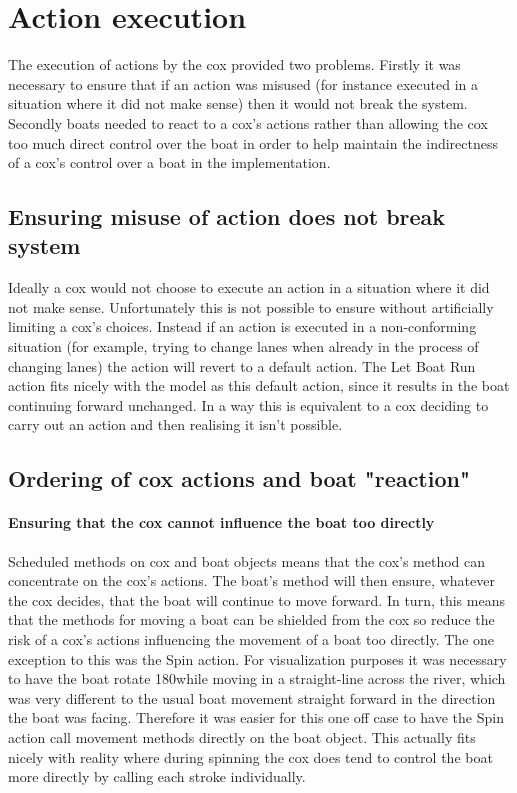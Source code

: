   \section{Action execution}
  The execution of actions by the cox provided two problems. Firstly it was necessary to ensure that if an action was misused (for instance executed in a situation where it did not make sense) then it would not break the system. Secondly boats needed to react to a cox's actions rather than allowing the cox too much direct control over the boat in order to help maintain the indirectness of a cox's control over a boat in the implementation.
  
    \subsection{Ensuring misuse of action does not break system}
    Ideally a cox would not choose to execute an action in a situation where it did not make sense. Unfortunately this is not possible to ensure without artificially limiting a cox's choices. Instead if an action is executed in a non-conforming situation (for example, trying to change lanes when already in the process of changing lanes) the action will revert to a default action. The Let Boat Run action fits nicely with the model as this default action, since it results in the boat continuing forward unchanged. In a way this is equivalent to a cox deciding to carry out an action and then realising it isn't possible.
    
    \subsection{Ordering of cox actions and boat "reaction"}
    \paragraph{Ensuring that the cox cannot influence the boat too directly}
    Scheduled methods on cox and boat objects means that the cox's method can concentrate on the cox's actions. The boat's method will then ensure, whatever the cox decides, that the boat will continue to move forward. In turn, this means that the methods for moving a boat can be shielded from the cox so reduce the risk of a cox's actions influencing the movement of a boat too directly. The one exception to this was the Spin action. For visualization purposes it was necessary to have the boat rotate 180\textdegree while moving in a straight-line across the river, which was very different to the usual boat movement straight forward in the direction the boat was facing. Therefore it was easier for this one off case to have the Spin action call movement methods directly on the boat object. This actually fits nicely with reality where during spinning the cox does tend to control the boat more directly by calling each stroke individually.
      
